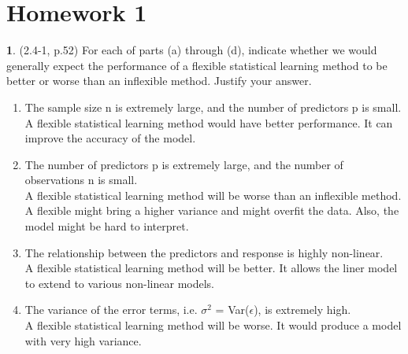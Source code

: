 \documentclass[12pt]{article}
\theoremstyle{definition}
\newtheorem{problem}{}
\begin{document}
 
%

\rhead{\today}
 

\section*{Homework 1}
	\begin{problem} (2.4-1, p.52) For each of parts (a) through (d), indicate whether we would generally expect the performance of a flexible statistical learning method to be better or worse than an inflexible method. Justify your answer.
		\begin{enumerate}
  			\item The sample size n is extremely large, and the number of predictors p is small.
  			\\[3pt]
			A flexible statistical learning method would have better performance. It can improve the accuracy of the model.

			\item The number of predictors p is extremely large, and the number of observations n is small.
			\\[3pt]
			A flexible statistical learning method will be worse than an inflexible method. A flexible might bring a higher variance and might overfit the data. Also, the model might be hard to interpret.

			\item The relationship between the predictors and response is highly non-linear.
			\\[3pt]
			A flexible statistical learning method will be better. It allows the liner model to extend to various non-linear models.

			\item The variance of the error terms, i.e. $\sigma^2$ = Var($\epsilon$), is extremely high.
			\\[3pt]
			A flexible statistical learning method will be worse. It would produce a model with very high variance.

		\end{enumerate}
	\end{problem}
\end{document}
